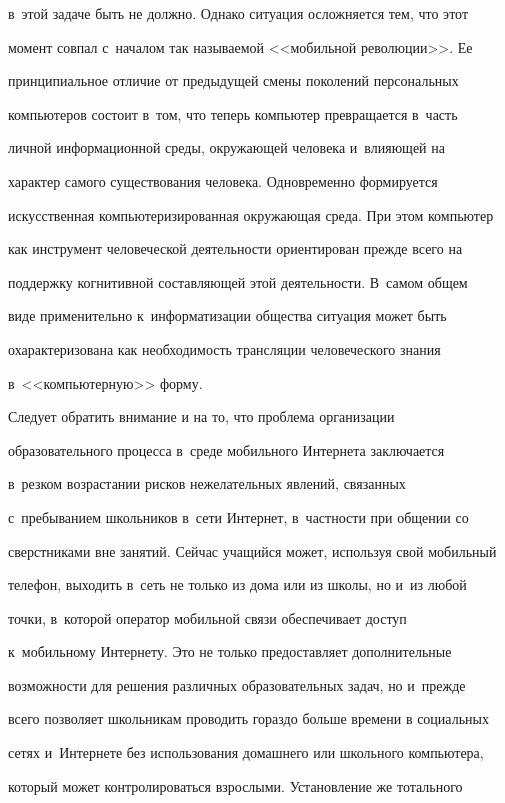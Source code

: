 в~этой задаче быть не должно. Однако ситуация осложняется тем, что этот


момент совпал с~началом так называемой <<мобильной революции>>. Ее


принципиальное отличие от предыдущей смены поколений персональных


компьютеров состоит в~том, что теперь компьютер превращается в~часть


личной информационной среды, окружающей человека и~влияющей на


характер самого существования человека. Одновременно формируется


искусственная компьютеризированная окружающая среда. При этом компьютер


как инструмент человеческой деятельности ориентирован прежде всего на


поддержку когнитивной составляющей этой деятельности. В~самом общем


виде применительно к~информатизации общества ситуация может быть


охарактеризована как необходимость трансляции человеческого знания


в~<<компьютерную>> форму.





     Следует обратить внимание и на то, что проблема организации


образовательного процесса в~среде мобильного Интернета заключается


в~резком возрастании рисков нежелательных явлений, связанных


с~пребыванием школьников в~сети Интернет, в~частности при общении со


сверстниками вне занятий. Сейчас учащийся может, используя свой мобильный


телефон, выходить в~сеть не только из дома или из школы, но и~из любой


точки, в~которой оператор мобильной связи обеспечивает доступ


к~мобильному Интернету. Это не только предоставляет дополнительные


возможности для решения различных образовательных задач, но и~прежде


всего позволяет школьникам проводить гораздо больше времени в социальных


сетях и~Интернете без использования домашнего или школьного компьютера,


который может контролироваться взрослыми. Установление же тотального


